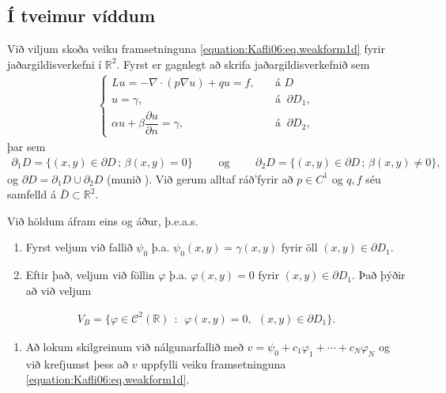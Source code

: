 \documentclass[a4paper,10pt,icelandic]{sphinxmanual}
\begin{document}
\subsection{Í tveimur víddum}
\label{\detokenize{Kafli06:i-tveimur-viddum}}
Við viljum skoða veiku framsetninguna \eqref{equation:Kafli06:eq.weakform1d} fyrir jaðargildisverkefni í \(\mathbb{R}^2\).
Fyrst er gagnlegt að skrifa jaðargildisverkefnið sem
\begin{equation*}
\begin{split}\begin{cases}
Lu=-\nabla\cdot (p\nabla u)+qu=f, \quad &\text{á } D\\
u=\gamma,\quad &\text{á } \ \partial D_1,\\
\alpha u+\beta\dfrac{\partial u}{\partial n}
=\gamma, \quad  &\text{á } \ \partial D_2,
\end{cases}\end{split}
\end{equation*}
þar sem
\begin{equation*}
\begin{split}\partial_1D=\{(x,y)\in \partial D\,;\, \beta(x,y)=0\}
\qquad \text{ og } \qquad
\partial_2D=\{(x,y)\in \partial D\,;\, \beta(x,y)\neq 0\},\end{split}
\end{equation*}
og \(\partial D=\partial_1D\cup \partial_2 D\) (munið ). Við gerum alltaf ráð’fyrir að \(p\in C^1\) og \(q, f\) séu samfelld á \(\bar D\subset\mathbb{R}^2\).

Við höldum áfram eins og áður, þ.e.a.s.
\begin{enumerate}
\def\theenumi{\arabic{enumi}}
\def\labelenumi{\theenumi .}
\makeatletter\def\p@enumii{\p@enumi \theenumi .}\makeatother
\item {} 
Fyrst veljum við fallið \(\psi_0\) þ.a. \(\psi_0(x,y) = \gamma(x,y)\) fyrir öll \((x,y)\in\partial D_1\).

\item {} 
Eftir það, veljum við föllin \(\varphi\) þ.a. \(\varphi(x,y)=0\) fyrir \((x,y)\in\partial D_1\). Það þýðir að við veljum

\end{enumerate}
\begin{equation*}
\begin{split}V_B=\{ \varphi\in \mathcal{C}^2(\mathbb R)~~: ~~ \varphi(x,y)=0, ~~ (x,y)\in \partial D_1 \}.\end{split}
\end{equation*}\begin{enumerate}
\def\theenumi{\arabic{enumi}}
\def\labelenumi{\theenumi .}
\makeatletter\def\p@enumii{\p@enumi \theenumi .}\makeatother
\setcounter{enumi}{2}
\item {} 
Að lokum skilgreinum við nálgunarfallið með \(v=\psi_0+c_1\varphi_1+\cdots+c_N\varphi_N\) og við krefjumst þess að \(v\) uppfylli veiku framsetninguna \eqref{equation:Kafli06:eq.weakform1d}.

\end{enumerate}
\end{document}
